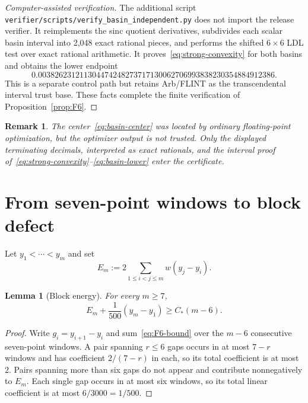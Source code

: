 \documentclass[11pt]{article}
\newtheorem{lemma}[theorem]{Lemma}
\newtheorem{remark}[theorem]{Remark}
\begin{document}
\begin{proof}[Computer-assisted verification]
The additional script
\texttt{verifier/scripts/verify\_basin\_independent.py} does not import the
release verifier.  It reimplements the sinc quotient derivatives,
subdivides each scalar basin interval into 2,048 exact rational pieces, and
performs the shifted $6\times6$ LDL test over exact rational arithmetic.  It
proves~\eqref{eq:strong-convexity} for both basins and obtains the lower
endpoint
\[
 0.003826231211304474248273717130062706993838230354884912386.
\]
This is a separate control path but retains Arb/FLINT as the transcendental
interval trust base.  These facts complete the finite verification of
Proposition~\ref{prop:F6}.
\end{proof}

\begin{remark}
The center~\eqref{eq:basin-center} was located by ordinary floating-point
optimization, but the optimizer output is not trusted.  Only the displayed
terminating decimals, interpreted as exact rationals, and the interval proof
of~\eqref{eq:strong-convexity}--\eqref{eq:basin-lower} enter the certificate.
\end{remark}

\section{From seven-point windows to block defect}\label{sec:block}

Let $y_1<\cdots<y_m$ and set
\begin{equation}\label{eq:Em}
 E_m:=2\sum_{1\le i<j\le m}w(y_j-y_i).
\end{equation}

\begin{lemma}[Block energy]\label{lem:block-energy}
For every $m\ge7$,
\begin{equation}\label{eq:block-energy}
 E_m+\frac1{500}(y_m-y_1)\ge C_*(m-6).
\end{equation}
\end{lemma}

\begin{proof}
Write $g_i=y_{i+1}-y_i$ and sum~\eqref{eq:F6-bound} over the $m-6$
consecutive seven-point windows.  A pair spanning $r\le6$ gaps occurs in at
most $7-r$ windows and has coefficient $2/(7-r)$ in each, so its total
coefficient is at most $2$.  Pairs spanning more than six gaps do not appear
and contribute nonnegatively to $E_m$.  Each single gap occurs in at most six
windows, so its total linear coefficient is at most $6/3000=1/500$.
\end{proof}
\end{document}
